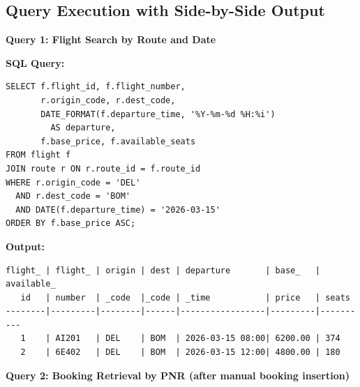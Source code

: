 \documentclass[12pt, a4paper]{article}
\begin{document}
\subsection{Query Execution with Side-by-Side Output}

\textbf{Query 1: Flight Search by Route and Date}

\noindent\begin{minipage}[t]{0.48\textwidth}
\textbf{SQL Query:}
\begin{lstlisting}[style=sqlstyle,basicstyle=\tiny\ttfamily,showstringspaces=false]
SELECT f.flight_id, f.flight_number, 
       r.origin_code, r.dest_code,
       DATE_FORMAT(f.departure_time, '%Y-%m-%d %H:%i') 
         AS departure,
       f.base_price, f.available_seats
FROM flight f
JOIN route r ON r.route_id = f.route_id
WHERE r.origin_code = 'DEL'
  AND r.dest_code = 'BOM'
  AND DATE(f.departure_time) = '2026-03-15'
ORDER BY f.base_price ASC;
\end{lstlisting}
\end{minipage}\hfill
\begin{minipage}[t]{0.48\textwidth}
\textbf{Output:}
\begin{lstlisting}[style=sqlstyle,basicstyle=\tiny\ttfamily,showstringspaces=false]
flight_ | flight_ | origin | dest | departure       | base_   | available_
   id   | number  | _code  |_code | _time           | price   | seats
--------|---------|--------|------|-----------------|---------|----------
   1    | AI201   | DEL    | BOM  | 2026-03-15 08:00| 6200.00 | 374
   2    | 6E402   | DEL    | BOM  | 2026-03-15 12:00| 4800.00 | 180
\end{lstlisting}
\end{minipage}

\vspace{0.3cm}

\textbf{Query 2: Booking Retrieval by PNR (after manual booking insertion)}
\end{document}
